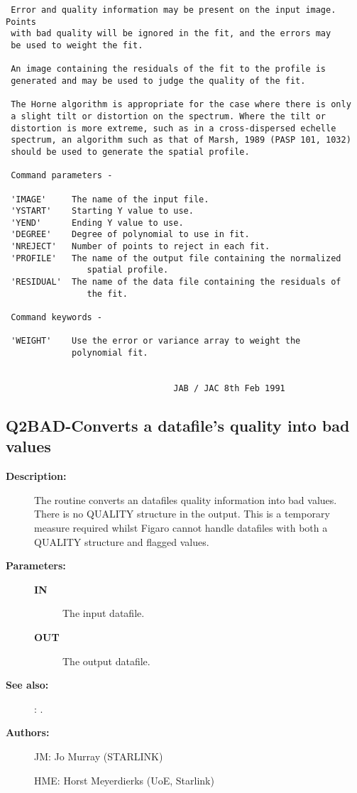 \begin{description}
\begin{verbatim}
 Error and quality information may be present on the input image. Points
 with bad quality will be ignored in the fit, and the errors may
 be used to weight the fit.

 An image containing the residuals of the fit to the profile is
 generated and may be used to judge the quality of the fit.

 The Horne algorithm is appropriate for the case where there is only
 a slight tilt or distortion on the spectrum. Where the tilt or
 distortion is more extreme, such as in a cross-dispersed echelle
 spectrum, an algorithm such as that of Marsh, 1989 (PASP 101, 1032)
 should be used to generate the spatial profile.

 Command parameters -

 'IMAGE'     The name of the input file.
 'YSTART'    Starting Y value to use.
 'YEND'      Ending Y value to use.
 'DEGREE'    Degree of polynomial to use in fit.
 'NREJECT'   Number of points to reject in each fit.
 'PROFILE'   The name of the output file containing the normalized
                spatial profile.
 'RESIDUAL'  The name of the data file containing the residuals of
                the fit.

 Command keywords -

 'WEIGHT'    Use the error or variance array to weight the
             polynomial fit.


                                 JAB / JAC 8th Feb 1991
\end{verbatim}
\end{description}
\subsection{Q2BAD-\label{Q2BAD}Converts a datafile's quality into bad values}
\begin{description}

\item [{\bf Description:}]
 The routine converts an datafiles quality information into bad values.
 There is no QUALITY structure in the output.
 This is a temporary measure required whilst Figaro cannot handle
 datafiles with both a QUALITY structure and flagged values.

\item [{\bf Parameters:}]
\begin{description}
\item [{\bf IN}]
 The input datafile.
\item [{\bf OUT}]
 The output datafile.
\end{description}

\item [{\bf See also:}]
: .\\

\item [{\bf Authors:}]
 JM: Jo Murray (STARLINK)

 HME: Horst Meyerdierks (UoE, Starlink)
\end{description}
